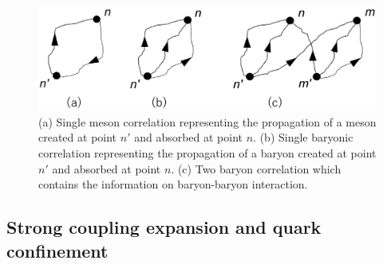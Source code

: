  \begin{figure}[t]
\begin{center}
\includegraphics[scale=0.2]{Chapter3-figures/correlations.eps}
 \end{center}
\caption{
(a) Single meson correlation representing the propagation of a  meson created at point $n'$ and absorbed at point $n$.
(b)  Single baryonic correlation representing the propagation of a  baryon created at point $n'$ and absorbed at point $n$.
(c)  Two baryon correlation which contains the information on baryon-baryon interaction.}
\label{fig:correlation}
\end{figure}
 
   
\subsection{Strong coupling expansion and quark confinement}


